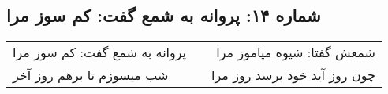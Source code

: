 \begin{center}
\section*{شماره ۱۴: پروانه به شمع گفت: کم سوز مرا}
\label{sec:014}
\begin{longtable}{l p{0.5cm} r}
پروانه به شمع گفت: کم سوز مرا
&&
شمعش گفتا: شیوه میاموز مرا
\\
شب میسوزم تا برهم روز آخر
&&
چون روز آید خود برسد روز مرا
\\
\end{longtable}
\end{center}
